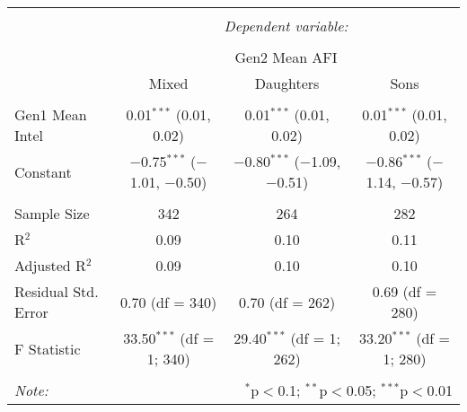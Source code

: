 
\begingroup 
\small 
\begin{tabular}{@{\extracolsep{1pt}}lccc} 
\\[-1.8ex]\hline 
\hline \\[-1.8ex] 
 & \multicolumn{3}{c}{\textit{Dependent variable:}} \\ 
\cline{2-4} 
\\[-1.8ex] & \multicolumn{3}{c}{Gen2 Mean AFI} \\ 
 & Mixed & Daughters & Sons \\ 
\hline \\[-1.8ex] 
 Gen1 Mean Intel & 0.01$^{***}$ (0.01, 0.02) & 0.01$^{***}$ (0.01, 0.02) & 0.01$^{***}$ (0.01, 0.02) \\ 
  Constant & $-$0.75$^{***}$ ($-$1.01, $-$0.50) & $-$0.80$^{***}$ ($-$1.09, $-$0.51) & $-$0.86$^{***}$ ($-$1.14, $-$0.57) \\ 
 \hline \\[-1.8ex] 
Sample Size & 342 & 264 & 282 \\ 
R$^{2}$ & 0.09 & 0.10 & 0.11 \\ 
Adjusted R$^{2}$ & 0.09 & 0.10 & 0.10 \\ 
Residual Std. Error & 0.70 (df = 340) & 0.70 (df = 262) & 0.69 (df = 280) \\ 
F Statistic & 33.50$^{***}$ (df = 1; 340) & 29.40$^{***}$ (df = 1; 262) & 33.20$^{***}$ (df = 1; 280) \\ 
\hline 
\hline \\[-1.8ex] 
\textit{Note:}  & \multicolumn{3}{r}{$^{*}$p$<$0.1; $^{**}$p$<$0.05; $^{***}$p$<$0.01} \\ 
\end{tabular} 
\endgroup 
